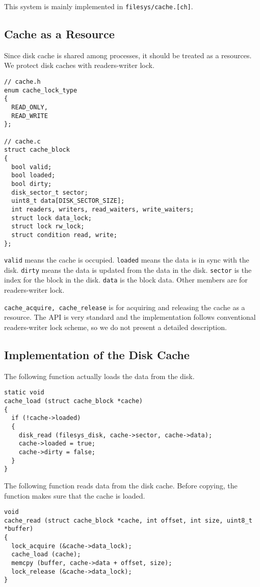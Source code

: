 \documentclass[a4paper,article,11pt,oneside]{article}
\begin{document}
This system is mainly implemented in \texttt{filesys/cache.[ch]}.

\subsection{Cache as a Resource}
Since disk cache is shared among processes, it should be treated as a
resources. We protect disk caches with readers-writer lock.
\begin{verbatim}
// cache.h
enum cache_lock_type
{
  READ_ONLY,
  READ_WRITE
};

// cache.c
struct cache_block 
{
  bool valid;
  bool loaded;
  bool dirty;
  disk_sector_t sector;
  uint8_t data[DISK_SECTOR_SIZE];
  int readers, writers, read_waiters, write_waiters;
  struct lock data_lock;
  struct lock rw_lock;
  struct condition read, write;
};
\end{verbatim}

\texttt{valid} means the cache is occupied. \texttt{loaded} means the
data is in sync with the disk. \texttt{dirty} means the data is
updated from the data in the disk. \texttt{sector} is the index for
the block in the disk. \texttt{data} is the block data. Other members
are for readers-writer lock.

\texttt{cache\_acquire, cache\_release} is for acquiring and releasing
the cache as a resource. The API is very standard and the
implementation follows conventional readers-writer lock scheme, so we
do not present a detailed description.

\subsection{Implementation of the Disk Cache}
The following function actually loads the data from the disk.
\begin{verbatim}
static void
cache_load (struct cache_block *cache)
{
  if (!cache->loaded)
  {
    disk_read (filesys_disk, cache->sector, cache->data);
    cache->loaded = true;
    cache->dirty = false;
  }
}
\end{verbatim}

The following function reads data from the disk cache. Before copying,
the function makes sure that the cache is loaded.
\begin{verbatim}
void
cache_read (struct cache_block *cache, int offset, int size, uint8_t *buffer)
{
  lock_acquire (&cache->data_lock);
  cache_load (cache);
  memcpy (buffer, cache->data + offset, size);
  lock_release (&cache->data_lock);
}
\end{verbatim}
\end{document}
